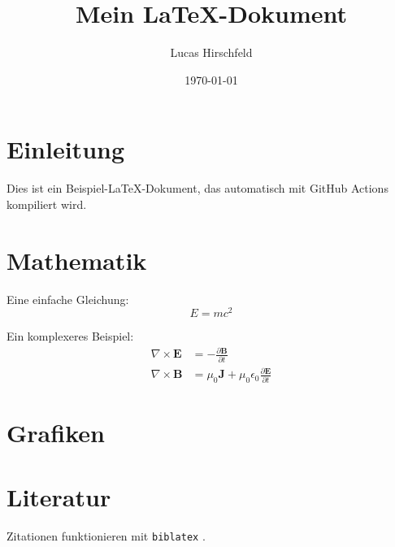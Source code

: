 \documentclass[12pt,a4paper]{article}
\title{Mein LaTeX-Dokument}
\author{Lucas Hirschfeld}
\date{\today}
\begin{document}
\maketitle

\tableofcontents
\newpage

\section{Einleitung}

Dies ist ein Beispiel-LaTeX-Dokument, das automatisch mit GitHub Actions kompiliert wird.

\section{Mathematik}

Eine einfache Gleichung:
\begin{equation}
    E = mc^2
\end{equation}

Ein komplexeres Beispiel:
\begin{align}
    \nabla \times \mathbf{E} &= -\frac{\partial \mathbf{B}}{\partial t} \\
    \nabla \times \mathbf{B} &= \mu_0 \mathbf{J} + \mu_0 \epsilon_0 \frac{\partial \mathbf{E}}{\partial t}
\end{align}

\section{Grafiken}


\section{Literatur}

Zitationen funktionieren mit \texttt{biblatex} \cite{beispielquelle}.

\newpage
\printbibliography
\end{document}
